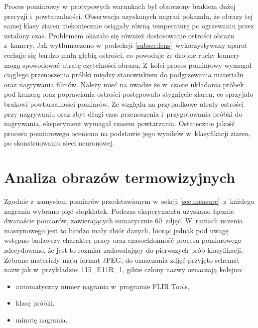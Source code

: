 Proces pomiarowy w~protypowych warunkach był obarczony brakiem dużej precyzji
i~powtarzalności.
Obserwacja uzyskanych nagrań pokazała, że obrazy tej samej klasy ziaren
niekoniecznie osiągały równą temperaturę po ogrzewaniu przez ustalony czas.
Problemem okazało się również dostosowanie ostrości obrazu z~kamery.
Jak wytłumaczono w~podsekcji \ref{subsec:lens}~wykorzystywany aparat cechuje
się bardzo małą głębią ostrości, co powoduje że drobne ruchy kamery mogą
spowodować utratę czytelności obrazu.
Z~kolei proces pomiarowy wymagał ciągłego przenoszenia próbki między
stanowiskiem do podgrzewania materiału oraz nagrywania filmów.
Należy mieć na uwadze że w~czasie układania próbek pod kamerą oraz poprawiania
ostrości postępowało stygnięcie ziaren, co sprzyjało brakowi powtarzalności
pomiarów.
Ze względu na przypadkowe utraty ostrości przy nagrywaniu oraz zbyt długi czas
przenoszenia i~przygotowania próbki do nagrywania, eksperyment wymagał czasem
powtarzania.
Ostatecznie jakość procesu pomiarowego oceniono na podstawie jego wyników
w~klasyfikacji ziaren, po skonstruowaniu sieci neuronowej.

\section{Analiza obrazów termowizyjnych}
Zgodnie z~zamysłem pomiarów przedstawionym w~sekcji \ref{sec:measure}~z~każdego
nagrania wybrano pięć stopklatek.
Podczas eksperymentu uzyskano łącznie dwanaście pomiarów, zawierających
sumarycznie 60~zdjęć.
W~ramach uczenia maszynowego jest to bardzo mały zbiór danych, biorąc jednak
pod uwagę wstępno-badawczy charakter pracy oraz czasochłonność procesu
pomiarowego zdecydowano, że jest to rozmiar zadawalający do pierwszych prób
klasyfikacji.
Zebrane materiały mają format JPEG, do oznaczania zdjęć przyjęto schemat nazw
jak w~przykładzie: 115\_E11R\_1, gdzie człony nazwy oznaczają kolejno:
\begin{itemize}
    \item automatyczny numer nagrania w~programie FLIR Tools,
    \item klasę próbki,
    \item minutę nagrania.
\end{itemize}

